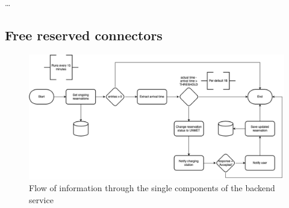\dots

\subsection{Free reserved connectors}
\label{ch:Implementation:sec:Implemented Use Cases:ssec:Free reserved connectors}

\begin{figure}[!ht]
    \centering
    \includegraphics[scale=0.4]{resources/images/main/6_implementation/scheduler/CancelUnmetReservation.png}
    \caption{Flow of information through the single components of the backend service}
    \label{fig:free-connector-flow}
\end{figure}